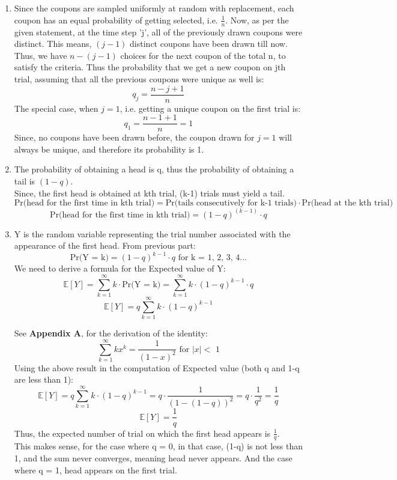 \documentclass{article}
\begin{document}
\begin{enumerate}
\\
\\
\begin{enumerate}
    \item Since the coupons are sampled uniformly at random with replacement, each coupon has an equal probability of getting selected, i.e. $\frac{1}{n}$. Now, as per the given statement, at the time step 'j', all of the previously drawn coupons were distinct. This means, $(j-1)$ distinct coupons have been drawn till now. Thus, we have $n - (j - 1)$ choices for the next coupon of the total n, to satisfy the criteria. Thus the probability that we get a new coupon on jth trial, assuming that all the previous coupons were unique as well is:
    \[
        \boxed{q_j = \frac{n-j+1}{n}}
    \]
    The special case, when $j = 1$, i.e. getting a unique coupon on the first trial is:
    \[
        \boxed{q_1 = \frac{n-1+1}{n} = 1}
    \]
    Since, no coupons have been drawn before, the coupon drawn for $j=1$ will always be unique, and therefore its probability is 1.

    \item The probability of obtaining a head is q, thus the probability of obtaining a tail is $(1-q)$.\\
    Since, the first head is obtained at kth trial, (k-1) trials must yield a tail.
    \[
        \text{Pr(head for the first time in kth trial)} = \text{Pr(tails consecutively for k-1 trials)} \cdot \text{Pr(head at the kth trial)}
    \]
    \[
        \boxed{\text{Pr(head for the first time in kth trial)} = (1-q)^{(k-1)} \cdot q}
    \]
    
    \item Y is the random variable representing the trial number associated with the appearance of the first head. From previous part:
    \[
        \text{Pr(Y = k)} = (1-q)^{k-1}\cdot q \text{   for k = 1, 2, 3, 4...}
    \]
    We need to derive a formula for the Expected value of Y:
    \[
        \mathbb{E}[Y] = \sum_{k=1}^{\infty}k\cdot \text{Pr(Y = k)} = \sum_{k=1}^{\infty}k\cdot (1-q)^{k-1}\cdot q
    \]
    \[
        \mathbb{E}[Y] = q \sum_{k=1}^{\infty}k\cdot (1-q)^{k-1}
    \]

    See \textbf{Appendix A}, for the derivation of the identity:
    \[
        \sum_{k=1}^{\infty}kx^k = \frac{1}{(1-x)^2} \text{ for $|x| <$ 1}
    \]
    Using the above result in the computation of Expected value (both q and 1-q are less than 1):
    \[
        \mathbb{E}[Y] = q \sum_{k=1}^{\infty}k\cdot (1-q)^{k-1} = q \cdot \frac{1}{(1-(1-q))^2} = q\cdot\frac{1}{q^2} = \frac{1}{q}
    \]
    \[
        \boxed{\mathbb{{E}}[Y] = \frac{1}{q}}
    \]
    Thus, the expected number of trial on which the first head appears is \textbf{$\frac{1}{q}$}. \\This makes sense, for the case where q = 0, in that case, (1-q) is not less than 1, and the sum never converges, meaning head never appears. And the case where q = 1, head appears on the first trial.



\end{enumerate}
\end{enumerate}
\end{document}
